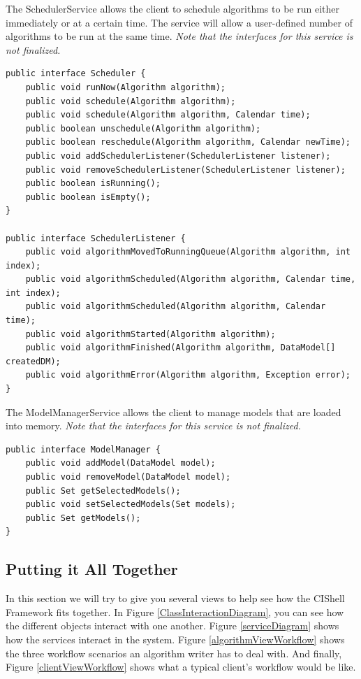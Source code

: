 \documentclass[a4]{article}
\begin{document}
The SchedulerService allows the client to schedule algorithms to be run either
immediately or at a certain time. The service will allow a user-defined number
of algorithms to be run at the same time. \textit{Note that the interfaces for
this service is not finalized.} 

\begin{verbatim}
public interface Scheduler {
    public void runNow(Algorithm algorithm);
    public void schedule(Algorithm algorithm);
    public void schedule(Algorithm algorithm, Calendar time);
    public boolean unschedule(Algorithm algorithm);
    public boolean reschedule(Algorithm algorithm, Calendar newTime);
    public void addSchedulerListener(SchedulerListener listener);
    public void removeSchedulerListener(SchedulerListener listener);
    public boolean isRunning();
    public boolean isEmpty();
}

public interface SchedulerListener {
    public void algorithmMovedToRunningQueue(Algorithm algorithm, int index);
    public void algorithmScheduled(Algorithm algorithm, Calendar time, int index);
    public void algorithmScheduled(Algorithm algorithm, Calendar time);
    public void algorithmStarted(Algorithm algorithm);
    public void algorithmFinished(Algorithm algorithm, DataModel[] createdDM);
    public void algorithmError(Algorithm algorithm, Exception error);
}
\end{verbatim}

The ModelManagerService allows the client to manage models that are loaded into
memory. \textit{Note that the interfaces for this service is not finalized.} 

\begin{verbatim}
public interface ModelManager {
    public void addModel(DataModel model);
    public void removeModel(DataModel model);
    public Set getSelectedModels();
    public void setSelectedModels(Set models);
    public Set getModels();
}
\end{verbatim}

\subsection{Putting it All Together}

In this section we will try to give you several views to help see how the 
CIShell Framework fits together. In Figure \ref{ClassInteractionDiagram}, you 
can see how the different objects interact with one another. Figure 
\ref{serviceDiagram} shows how the services interact in the system. Figure 
\ref{algorithmViewWorkflow} shows the three workflow scenarios an algorithm 
writer has to deal with. And finally, Figure \ref{clientViewWorkflow} shows 
what a typical client's workflow would be like.
\end{document}
